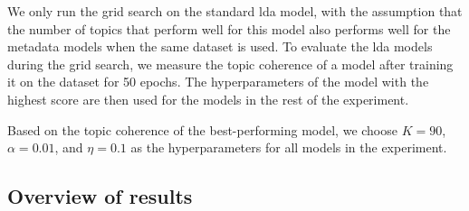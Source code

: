 We only run the grid search on the standard \gls{lda} model, with the assumption that the number of topics that perform well for this model also performs well for the metadata models when the same dataset is used.
To evaluate the \gls{lda} models during the grid search, we measure the topic coherence of a model after training it on the dataset for 50 epochs.
The hyperparameters of the model with the highest score are then used for the models in the rest of the experiment.

Based on the topic coherence of the best-performing model, we choose $K = 90$, $\alpha = 0.01$, and $\eta = 0.1$ as the hyperparameters for all models in the experiment.



\subsection{Overview of results}\label{sec:results}


